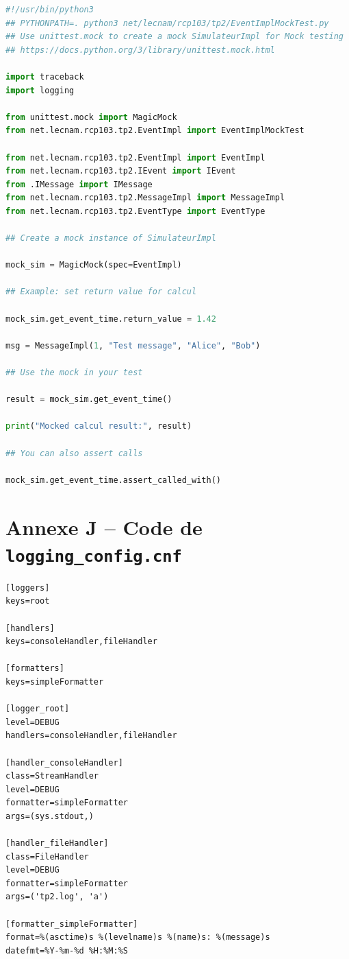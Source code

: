 \documentclass{article}
\begin{document}
\begin{lstlisting}[language=Python, caption=EventImplMockTest.py]
#!/usr/bin/python3
## PYTHONPATH=. python3 net/lecnam/rcp103/tp2/EventImplMockTest.py
## Use unittest.mock to create a mock SimulateurImpl for Mock testing
## https://docs.python.org/3/library/unittest.mock.html

import traceback
import logging

from unittest.mock import MagicMock
from net.lecnam.rcp103.tp2.EventImpl import EventImplMockTest

from net.lecnam.rcp103.tp2.EventImpl import EventImpl
from net.lecnam.rcp103.tp2.IEvent import IEvent
from .IMessage import IMessage
from net.lecnam.rcp103.tp2.MessageImpl import MessageImpl
from net.lecnam.rcp103.tp2.EventType import EventType

## Create a mock instance of SimulateurImpl

mock_sim = MagicMock(spec=EventImpl)

## Example: set return value for calcul

mock_sim.get_event_time.return_value = 1.42

msg = MessageImpl(1, "Test message", "Alice", "Bob")

## Use the mock in your test

result = mock_sim.get_event_time()

print("Mocked calcul result:", result)

## You can also assert calls

mock_sim.get_event_time.assert_called_with()
\end{lstlisting}

\section{Annexe J -- Code de \texttt{logging\_config.cnf}}

\begin{lstlisting}[caption=logging_config.cnf]
[loggers]
keys=root

[handlers]
keys=consoleHandler,fileHandler

[formatters]
keys=simpleFormatter

[logger_root]
level=DEBUG
handlers=consoleHandler,fileHandler

[handler_consoleHandler]
class=StreamHandler
level=DEBUG
formatter=simpleFormatter
args=(sys.stdout,)

[handler_fileHandler]
class=FileHandler
level=DEBUG
formatter=simpleFormatter
args=('tp2.log', 'a')

[formatter_simpleFormatter]
format=%(asctime)s %(levelname)s %(name)s: %(message)s
datefmt=%Y-%m-%d %H:%M:%S
\end{lstlisting}
\end{document}
